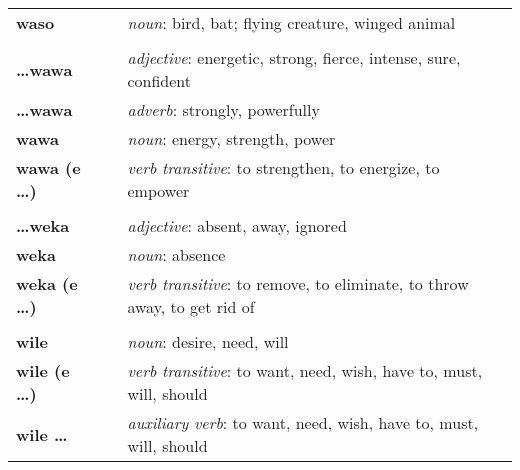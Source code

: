 \begin{supertabular}{p{2,5cm}|ll}
\textbf{waso} && \textit{noun}: bird, bat; flying creature, winged animal \\ 
 && \\ %
\textbf{\dots wawa} && \textit{adjective}: energetic, strong, fierce, intense, sure, confident \\ 
\textbf{\dots wawa} && \textit{adverb}: strongly, powerfully \\ 
\textbf{wawa} && \textit{noun}: energy, strength, power \\ 
\textbf{wawa (e \dots)} && \textit{verb transitive}: to strengthen, to energize, to empower \\ 
 && \\ %
\textbf{\dots weka} && \textit{adjective}: absent, away, ignored \\ 
\textbf{weka} && \textit{noun}: absence \\ 
\textbf{weka (e \dots)} && \textit{verb transitive}: to remove, to eliminate, to throw away, to get rid of \\ 
 && \\ %
\textbf{wile} && \textit{noun}: desire, need, will \\ 
\textbf{wile (e \dots)} && \textit{verb transitive}: to want, need, wish, have to, must, will, should \\ 
\textbf{wile \dots} && \textit{auxiliary verb}: to want, need, wish, have to, must, will, should \\ 
\end{supertabular} \\
%

